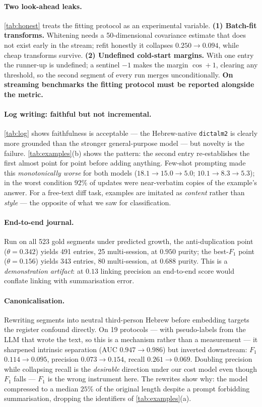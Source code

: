 \documentclass[11pt]{article}
\begin{document}
\paragraph{Two look-ahead leaks.}
\cref{tab:honest} treats the fitting protocol as an experimental variable.
\textbf{(1) Batch-fit transforms.} Whitening needs a 50-dimensional covariance estimate that
does not exist early in the stream; refit honestly it collapses $0.250\to0.094$, while cheap
transforms survive. \textbf{(2) Undefined cold-start margins.} With
one entry the runner-up is undefined; a sentinel $-1$ makes the margin $\cos+1$, clearing any
threshold, so the second segment of every run merges unconditionally. \textbf{On streaming
benchmarks the fitting protocol must be reported alongside the metric.}

\paragraph{Log writing: faithful but not incremental.}
\cref{tab:log} shows faithfulness is acceptable --- the Hebrew-native \texttt{dictalm2} is
clearly more grounded than the stronger general-purpose model --- but novelty is the failure.
\cref{tab:examples}(b) shows the pattern: the second entry re-establishes the first almost
point for point before adding anything. Few-shot prompting made this \emph{monotonically
worse} for both models ($18.1{\to}15.0{\to}5.0$; $10.1{\to}8.3{\to}5.3$); in the worst
condition $92\%$ of updates were near-verbatim copies of the example's answer. For a
free-text diff task, examples are imitated as \emph{content} rather than \emph{style} ---
the opposite of what we saw for classification.

\paragraph{End-to-end journal.}
Run on all 523 gold segments under predicted growth, the anti-duplication point
($\theta{=}0.342$) yields 491 entries, 25 multi-session, at $0.950$ purity; the best-$F_1$
point ($\theta{=}0.156$) yields 343 entries, 80 multi-session, at $0.688$ purity. This is a
\emph{demonstration artifact}: at $0.13$ linking precision an end-to-end score would conflate
linking with summarisation error.

\paragraph{Canonicalisation.}
Rewriting segments into neutral third-person Hebrew before embedding targets the register
confound directly. On 19 protocols --- with pseudo-labels from the LLM that wrote the text,
so this is a mechanism rather than a measurement --- it sharpened intrinsic separation (AUC
$0.947\to0.986$) but inverted downstream: $F_1$ $0.114\to0.095$, precision $0.073\to0.154$,
recall $0.261\to0.069$. Doubling precision while collapsing recall is the \emph{desirable}
direction under our cost model even though $F_1$ falls --- $F_1$ is the wrong instrument
here. The rewrites show why: the model compressed to a median $25\%$ of the original length
despite a prompt forbidding summarisation, dropping the identifiers of
\cref{tab:examples}(a).
\end{document}
